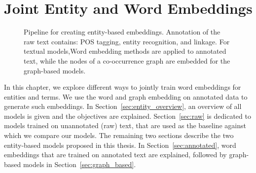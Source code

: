 \chapter{Joint Entity and Word Embeddings}\label{chap:entity}
\begin{figure}
\centering 
\resizebox{0.97\textwidth}{0.32\textwidth}{      

}
\caption{Pipeline for creating entity-based embeddings. Annotation of the raw text contains: POS tagging, entity recognition, and linkage. For textual models,Word embedding methods are applied to annotated text, while the nodes of a co-occurrence graph are embedded for the graph-based models.}
\label{fig:entity_emebddings_pipline}
\end{figure}
In this chapter, we explore different ways to jointly train word embeddings for entities and terms. We use the word and graph embedding on annotated data to generate such embeddings. In Section~\ref{sec:entity_overview}, an overview of all models is given and the objectives are explained. Section~\ref{sec:raw} is dedicated to models trained on unannotated (raw) text, that are used as the baseline against which we compare our models. The remaining two sections describe the two entity-based models proposed in this thesis. In Section~\ref{sec:annotated}, word embeddings that are trained on annotated text are explained, followed by graph-based models in Section~\ref{sec:graph_based}.
